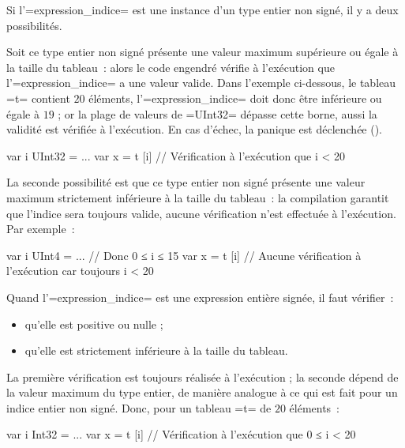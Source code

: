 
Si l'\plm=expression_indice= est une instance d'un type entier non signé, il y a deux possibilités.

Soit ce type entier non signé présente une valeur maximum supérieure ou égale à la taille du tableau~: alors le code engendré vérifie à l'exécution que l'\plm=expression_indice= a une valeur valide. Dans l'exemple ci-dessous, le tableau \plm=t= contient $20$ éléments, l'\plm=expression_indice= doit donc être inférieure ou égale à $19$ ; or la plage de valeurs de \plm=UInt32= dépasse cette borne, aussi la validité est vérifiée à l'exécution. En cas d'échec, la panique est déclenchée ().
\begin{PLM}
var i UInt32 = ...
var x = t [i] // Vérification à l'exécution que i < 20
\end{PLM}



La seconde possibilité est que ce type entier non signé présente une valeur maximum strictement inférieure à la taille du tableau~: la compilation garantit que l'indice sera toujours valide, aucune vérification n'est effectuée à l'exécution. Par exemple~:
\begin{PLM}
var i UInt4 = ... // Donc 0 ≤ i ≤ 15
var x = t [i] // Aucune vérification à l'exécution car toujours i < 20
\end{PLM}




Quand l'\plm=expression_indice= est une expression entière signée, il faut vérifier~:
\begin{itemize}
  \item qu'elle est positive ou nulle ;
  \item qu'elle est strictement inférieure à la taille du tableau.
\end{itemize}

La première vérification est toujours réalisée à l'exécution ; la seconde dépend de la valeur maximum du type entier, de manière analogue à ce qui est fait pour un indice entier non signé. Donc, pour un tableau \plm=t= de $20$ éléments~:

\begin{PLM}
var i Int32 = ...
var x = t [i] // Vérification à l'exécution que 0 ≤ i < 20
\end{PLM}


